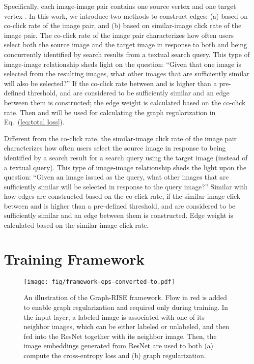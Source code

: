 \documentclass[sigconf]{acmart}
\begin{document}
Specifically, each image-image pair contains one source vertex  and one target vertex . In this work, we introduce two methods to construct edges: (a) based on co-click rate of the image pair, and (b) based on similar-image click rate of the image pair. The co-click rate of the image pair characterizes how often users select both the source image  and the target image  in response to both  and  being concurrently identified by search results from a textual search query. This type of image-image relationship sheds light on the question: ``Given that one image is selected from  the resulting images, what other images that are sufficiently similar will also be selected?'' If the co-click rate between  and  is higher than a pre-defined threshold,  and  are considered to be sufficiently similar and an edge between them is constructed; the edge weight  is calculated based on the co-click rate. Then  and  will be used for calculating the graph regularization  in Eq.~(\ref{eq:total loss}).


Different from the co-click rate, the similar-image click rate of the image pair characterizes how often users select the source image  in response to  being identified by a search result for a search query using the target image  (instead of a textual query). This type of image-image relationship sheds the light upon the question: ``Given an image issued as the query, what other images that are sufficiently similar will be selected in response to the query image?'' Similar with how edges are constructed based on the co-click rate, if the similar-image click between  and  is higher than a pre-defined threshold,  and  are considered to be sufficiently similar and an edge between them is constructed. Edge weight  is calculated based on the similar-image click rate. 
\section{Training Framework}
\label{sec:architecture}
\begin{figure*}[tbp]
  \texttt{[image: fig/framework-eps-converted-to.pdf]}
  \vspace{-16pt}
  \caption{An illustration of the Graph-RISE framework. Flow in red is added to enable graph regularization and required only during training. In the input layer, a labeled image is associated with one of its neighbor images, which can be either labeled or unlabeled, and then fed into the ResNet together with its neighbor image. Then, the image embeddings generated from ResNet are used to both (a) compute the cross-entropy loss and (b) graph regularization. 
  }
  \label{fig:graph_regularized_resnet}
\end{figure*}
\end{document}
